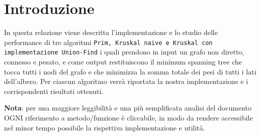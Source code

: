 \section{Introduzione}
\label{Introduzione}

In questa relazione viene descritta l'implementazione e lo studio delle performance di tre algoritmi \texttt{Prim, Kruskal naive e Kruskal con implementazione Union-Find} i quali prendono in input un grafo non diretto, connesso e pesato, e come output restituiscono il minimum spanning tree che tocca tutti i nodi del grafo e che minimizza la somma totale dei pesi di tutti i lati dell'albero.
Per ciascun algoritmo verrà riportata la nostra implementazione e i corrispondenti risultati ottenuti.
\newline

\textbf{Nota}: per una maggiore leggibilità e una più semplificata analisi del documento OGNI riferimento a metodo/funzione è cliccabile, in modo da rendere accessibile nel minor tempo possibile la rispettiva implementazione e utilità.
